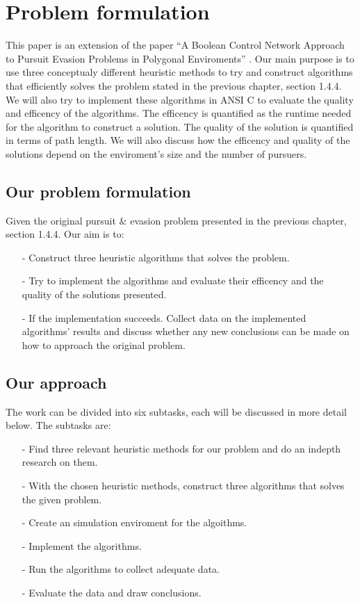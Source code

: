 \chapter{Problem formulation}

This paper is an extension of the paper ``A Boolean Control Network Approach to Pursuit Evasion Problems in Polygonal Enviroments'' \cite{paper1}. Our main purpose is to use three conceptualy different heuristic methods to try and construct algorithms that efficiently solves the problem stated in the previous chapter, section 1.4.4. We will also try to implement these algorithms in ANSI C to evaluate the quality and efficency of the algorithms. The efficency is quantified as the runtime needed for the algorithm to construct a solution. The quality of the solution is quantified in terms of path length. We will also discuss how the efficency and quality of the solutions depend on the enviroment's size and the number of pursuers.

\section{Our problem formulation}
Given the original pursuit \& evasion problem presented in the previous chapter, section 1.4.4. Our aim is to:
\begin{enumerate}
\item[-] Construct three heuristic algorithms that solves the problem.
\item[-] Try to implement the algorithms and evaluate their efficency and the quality of the solutions presented.
\item[-] If the implementation succeeds. Collect data on the implemented algorithms' results and discuss whether any new conclusions can be made on how to approach the original problem.
\end{enumerate}

\section{Our approach}
The work can be divided into six subtasks, each will be discussed in more detail below. The subtasks are:
\begin{enumerate}
\item[-] Find three relevant heuristic methods for our problem and do an indepth research on them.
\item[-] With the chosen heuristic methods, construct three algorithms that solves the given problem.
\item[-] Create an simulation enviroment for the algoithms.
\item[-] Implement the algorithms.
\item[-] Run the algorithms to collect adequate data.
\item[-] Evaluate the data and draw conclusions.
\end{enumerate}

